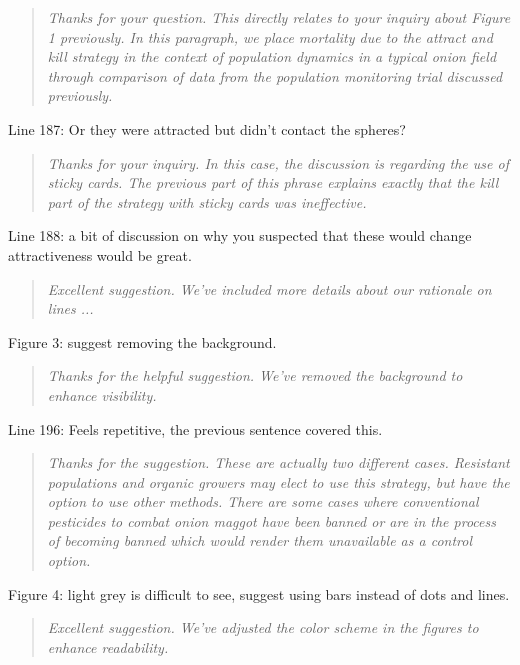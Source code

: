 \documentclass{article}
\begin{document}
\begin{quote}
    \textit{Thanks for your question.  This directly relates to your inquiry about Figure 1 previously.  In this paragraph, we place mortality due to the attract and kill strategy in the context of population dynamics in a typical onion field through comparison of data from the population monitoring trial discussed previously.  }
\end{quote}

Line 187: Or they were attracted but didn't contact the spheres?

\begin{quote}
    \textit{Thanks for your inquiry.  In this case, the discussion is regarding the use of sticky cards.  The previous part of this phrase explains exactly that the kill part of the strategy with sticky cards was ineffective.  }
\end{quote}

Line 188: a bit of discussion on why you suspected that these would change attractiveness would be great.

\begin{quote}
    \textit{Excellent suggestion.  We've included more details about our rationale on lines ...}
\end{quote}

Figure 3: suggest removing the background.  

\begin{quote}
    \textit{Thanks for the helpful suggestion.  We've removed the background to enhance visibility.  }
\end{quote}

Line 196: Feels repetitive, the previous sentence covered this.

\begin{quote}
    \textit{Thanks for the suggestion.  These are actually two different cases.  Resistant populations and organic growers may elect to use this strategy, but have the option to use other methods.  There are some cases where conventional pesticides to combat onion maggot have been banned or are in the process of becoming banned which would render them unavailable as a control option.  }
\end{quote}

Figure 4: light grey is difficult to see, suggest using bars instead of dots and lines.

\begin{quote}
    \textit{Excellent suggestion.  We've adjusted the color scheme in the figures to enhance readability.  }
\end{quote}
\end{document}
